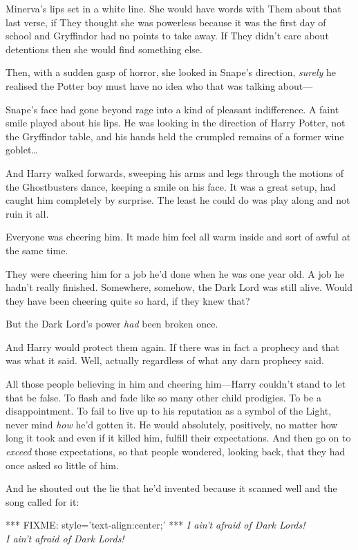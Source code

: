 Minerva's lips set in a white line. She would have words with Them about that 
last verse, if They thought she was powerless because it was the first day of 
school and Gryffindor had no points to take away. If They didn't care about 
detentions then she would find something else.

Then, with a sudden gasp of horror, she looked in Snape's direction, 
\emph{surely} he realised the Potter boy must have no idea who that was talking 
about---

Snape's face had gone beyond rage into a kind of pleasant indifference. A faint 
smile played about his lips. He was looking in the direction of Harry Potter, 
not the Gryffindor table, and his hands held the crumpled remains of a former 
wine goblet{\ldots}

And Harry walked forwards, sweeping his arms and legs through the motions of 
the Ghostbusters dance, keeping a smile on his face. It was a great setup, had 
caught him completely by surprise. The least he could do was play along and not 
ruin it all.

Everyone was cheering him. It made him feel all warm inside and sort of awful 
at the same time.

They were cheering him for a job he'd done when he was one year old. A job he 
hadn't really finished. Somewhere, somehow, the Dark Lord was still alive. 
Would they have been cheering quite so hard, if they knew that?

But the Dark Lord's power \emph{had} been broken once.

And Harry would protect them again. If there was in fact a prophecy and that 
was what it said. Well, actually regardless of what any darn prophecy said.

All those people believing in him and cheering him---Harry couldn't stand to 
let that be false. To flash and fade like so many other child prodigies. To be 
a disappointment. To fail to live up to his reputation as a symbol of the 
Light, never mind \emph{how} he'd gotten it. He would absolutely, positively, 
no matter how long it took and even if it killed him, fulfill their 
expectations. And then go on to \emph{exceed} those expectations, so that 
people wondered, looking back, that they had once asked so little of him.

And he shouted out the lie that he'd invented because it scanned well and the 
song called for it:

*** FIXME: style='text-align:center;' ***
\emph{I ain't afraid of Dark Lords!\\
I ain't afraid of Dark Lords!}


